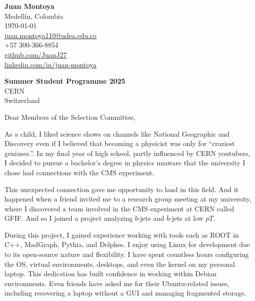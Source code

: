 \documentclass[11pt]{report}
\begin{document}
\begin{titlepage}
    
    
    \begin{minipage}[t]{0.95\textwidth}
        \hfill
        \raggedleft
        \textbf{Juan Montoya} \\
        Medellín, Colombia \\
        \today\\
        \href{mailto:juan.montoya110@udea.edu.co}{juan.montoya110@udea.edu.co} \\
        +57 300-366-8854 \\
        \href{https://github.com/JuanJ27}{github.com/JuanJ27} \\
        \href{https://www.linkedin.com/in/juan-montoya-68262071/}{linkedin.com/in/juan-montoya}
    \end{minipage}


\raggedright \textbf{Summer Student Programme 2025} \\ CERN \\ Switzerland

\vspace{0.7em}

\raggedright Dear Members of the Selection Committee,\\

\vspace{0.4em}

As a child, I liked science shows on channels like National Geographic and Discovery even if I believed that becoming a physicist was only for “craziest geniuses.”. In my final year of high school, partly influenced by CERN youtubers, I decided to pursue a bachelor’s degree in physics unaware that the university I chose had connections with the CMS experiment.

\vspace{0.4em}

This unexpected connection gave me opportunity to land in this field. And it happened when a friend invited me to a research group meeting at my university, where I discovered a team involved in the CMS experiment at CERN called GFIF. And so I joined a project analyzing \(b\)-jets and \(\bar{b}\)-jets at low $pT$.

\vspace{0.7em}

During this project, I gained experience working with tools such as ROOT in C++, MadGraph, Pythia, and Delphes. I enjoy using Linux for development due to its open-source nature and flexibility. I have spent countless hours configuring the OS, virtual environments, desktops, and even the kernel on my personal laptop. This dedication has built confidence in working within Debian environments. Even friends have asked me for their Ubuntu-related issues, including recovering a laptop without a GUI and managing fragmented storage.


\end{titlepage}
\end{document}
